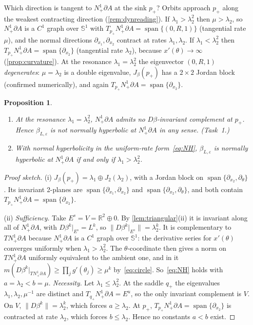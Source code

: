 \documentclass[11pt,a4paper]{article}
\newtheorem{proposition}[theorem]{Proposition}
\theoremstyle{definition}
\theoremstyle{remark}
\newcommand{\R}{\mathbb{R}}
\newcommand{\eps}{\varepsilon}
\newcommand{\Sph}{\mathbb{S}}
\newcommand{\Nb}{N^1_+\partial A}
\DeclareMathOperator{\spn}{span}
\begin{document}
Which direction is tangent to $\Nb$ at the sink $p_+$? Orbits approach $p_+$ along the weakest contracting direction
(\cref{rem:dynreading}). If $\lambda_1>\lambda_2^2$ then $\mu>\lambda_2$, so $\Nb$ is a $C^1$ graph over $\Sph^1$ with
$T_{p_+}\Nb=\spn\{(0,R,1)\}$ (tangential rate $\mu$), and the normal directions $\partial_{x_1},\partial_{x_2}$ contract at
rates $\lambda_1,\lambda_2$. If $\lambda_1<\lambda_2^2$ then $T_{p_+}\Nb=\spn\{\partial_{x_2}\}$ (tangential rate $\lambda_2$), because
$x'(\theta)\to\infty$ (\cref{prop:curvature}). At the resonance $\lambda_1=\lambda_2^2$ the eigenvector $(0,R,1)$
\emph{degenerates}: $\mu=\lambda_2$ is a double eigenvalue, $J_\beta(p_+)$ has a $2\times2$ Jordan block (confirmed numerically),
and again $T_{p_+}\Nb=\spn\{\partial_{x_2}\}$.

\begin{proposition}\label{prop:NH}
\begin{enumerate}[label=(\roman*)]
  \item At the resonance $\lambda_1=\lambda_2^2$, $\Nb$ admits no $D\beta$-invariant complement at $p_+$. Hence $\beta_{L,\eps}$ is
  not normally hyperbolic at $\Nb$ in any sense. \emph{(Task~1.)}
  \item With normal hyperbolicity in the uniform-rate form~\eqref{eq:NH}, $\beta_{L,\eps}$ is normally hyperbolic at $\Nb$ if
  and only if $\lambda_1>\lambda_2^2$.
\end{enumerate}
\end{proposition}
\begin{proof}[Proof sketch]
(i) $J_\beta(p_+)=\lambda_1\oplus J_2(\lambda_2)$, with a Jordan block on $\spn\{\partial_{x_2},\partial_\theta\}$. Its invariant
2-planes are $\spn\{\partial_{x_1},\partial_{x_2}\}$ and $\spn\{\partial_{x_2},\partial_\theta\}$, and both contain
$T_{p_+}\Nb=\spn\{\partial_{x_2}\}$.

(ii) \emph{Sufficiency.} Take $E^s=V=\R^2\oplus0$. By \cref{lem:triangular}(ii) it is invariant along all of $\Nb$, with
$D\beta^k|_{E^s}=L^k$, so $\|D\beta^k|_{E^s}\|=\lambda_2^k$. It is complementary to $T\Nb$ because $\Nb$ is a $C^1$ graph over
$\Sph^1$: the derivative series for $x'(\theta)$ converges uniformly when $\lambda_1>\lambda_2^2$. The $\theta$-coordinate
then gives a norm on $T\Nb$ uniformly equivalent to the ambient one, and in it
$m(D\beta^k|_{T\Nb})\ge\prod_j g'(\theta_j)\ge\mu^k$ by~\eqref{eq:circle}. So~\eqref{eq:NH} holds with $a=\lambda_2<b=\mu$.
\emph{Necessity.} Let $\lambda_1\le\lambda_2^2$. At the saddle $q_+$ the eigenvalues $\lambda_1,\lambda_2,\mu^{-1}$ are distinct
and $T_{q_+}\Nb=E^u$, so the only invariant complement is $V$. On $V$, $\|D\beta^k\|=\lambda_2^k$, which forces $a\ge\lambda_2$.
At $p_+$, $T_{p_+}\Nb=\spn\{\partial_{x_2}\}$ is contracted at rate $\lambda_2$, which forces $b\le\lambda_2$. Hence no constants
$a<b$ exist.
\end{proof}
\end{document}
